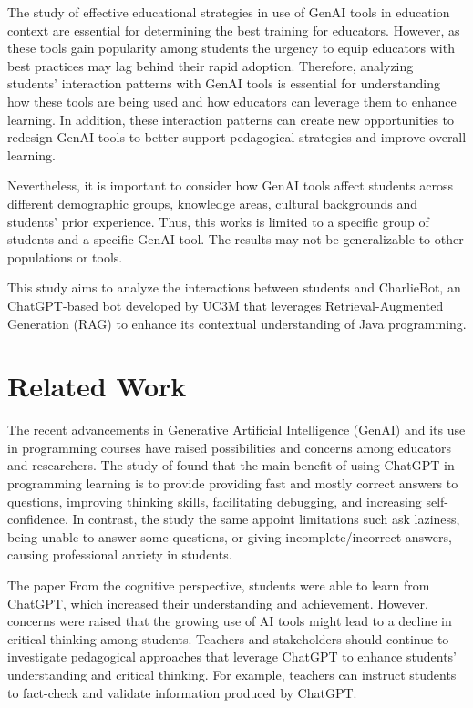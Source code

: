 \documentclass[conference]{IEEEtran}
\begin{document}

The study of effective educational strategies in use of GenAI tools in education
context are essential for determining the best training for educators. However,
as these tools gain popularity among students \cite{Dickey24} the urgency to
equip educators with best practices may lag behind their rapid adoption.
Therefore, analyzing students' interaction patterns with GenAI tools is
essential for understanding how these tools are being used and how educators can
leverage them to enhance learning. In addition, these interaction patterns can
create new opportunities to redesign GenAI tools to better support pedagogical
strategies and improve overall learning.


Nevertheless, it is important to consider how GenAI tools affect students across
different demographic groups, knowledge areas, cultural backgrounds \cite{catalan21}
\cite{neo22} and students' prior experience. Thus, this works is limited to a
specific group of students and a specific GenAI tool. The results may not be
generalizable to other populations or tools.


This study aims to analyze the interactions between students and CharlieBot,
an ChatGPT-based bot developed by UC3M that leverages Retrieval-Augmented
Generation (RAG) to enhance its contextual understanding of Java programming.

\section{Related Work}

The recent advancements in Generative Artificial Intelligence (GenAI) and its
use in programming courses have raised possibilities and concerns among
educators and researchers. The study of \cite{Yilmaz23} found that the main
benefit of using ChatGPT in programming learning is to provide providing fast
and mostly correct answers to questions, improving thinking skills, facilitating
debugging, and increasing self-confidence. In contrast, the study the same
appoint limitations such ask laziness, being unable to answer some questions,
or giving incomplete/incorrect answers, causing professional anxiety in students.


The paper \cite{Lo24} From the cognitive perspective, students were able to
learn from ChatGPT, which increased their understanding and achievement.
However, concerns were raised that the growing use of AI tools might lead to
a decline in critical thinking among students. Teachers and stakeholders should
continue to investigate pedagogical approaches that leverage ChatGPT to enhance
students' understanding and critical thinking. For example, teachers can
instruct students to fact-check and validate information produced by ChatGPT.
\end{document}
